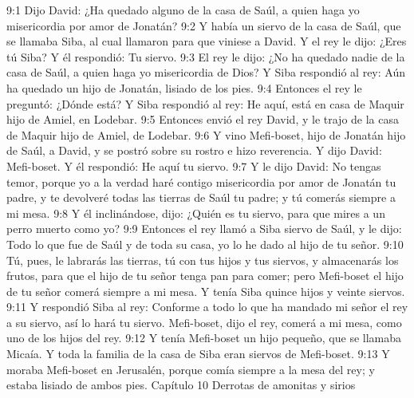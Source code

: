 9:1 Dijo David: ¿Ha quedado alguno de la casa de Saúl, a quien haga yo misericordia por amor de Jonatán? 
9:2 Y había un siervo de la casa de Saúl, que se llamaba Siba, al cual llamaron para que viniese a David. Y el rey le dijo: ¿Eres tú Siba? Y él respondió: Tu siervo.  
9:3 El rey le dijo: ¿No ha quedado nadie de la casa de Saúl, a quien haga yo misericordia de Dios? Y Siba respondió al rey: Aún ha quedado un hijo de Jonatán, lisiado de los pies.  
9:4 Entonces el rey le preguntó: ¿Dónde está? Y Siba respondió al rey: He aquí, está en casa de Maquir hijo de Amiel, en Lodebar.  
9:5 Entonces envió el rey David, y le trajo de la casa de Maquir hijo de Amiel, de Lodebar.  
9:6 Y vino Mefi-boset, hijo de Jonatán hijo de Saúl, a David, y se postró sobre su rostro e hizo reverencia. Y dijo David: Mefi-boset. Y él respondió: He aquí tu siervo.  
9:7 Y le dijo David: No tengas temor, porque yo a la verdad haré contigo misericordia por amor de Jonatán tu padre, y te devolveré todas las tierras de Saúl tu padre; y tú comerás siempre a mi mesa.  
9:8 Y él inclinándose, dijo: ¿Quién es tu siervo, para que mires a un perro muerto como yo?  
9:9 Entonces el rey llamó a Siba siervo de Saúl, y le dijo: Todo lo que fue de Saúl y de toda su casa, yo lo he dado al hijo de tu señor.  
9:10 Tú, pues, le labrarás las tierras, tú con tus hijos y tus siervos, y almacenarás los frutos, para que el hijo de tu señor tenga pan para comer; pero Mefi-boset el hijo de tu señor comerá siempre a mi mesa. Y tenía Siba quince hijos y veinte siervos.  
9:11 Y respondió Siba al rey: Conforme a todo lo que ha mandado mi señor el rey a su siervo, así lo hará tu siervo. Mefi-boset, dijo el rey, comerá a mi mesa, como uno de los hijos del rey.  
9:12 Y tenía Mefi-boset un hijo pequeño, que se llamaba Micaía. Y toda la familia de la casa de Siba eran siervos de Mefi-boset.  
9:13 Y moraba Mefi-boset en Jerusalén, porque comía siempre a la mesa del rey; y estaba lisiado de ambos pies.  
Capítulo 10
Derrotas de amonitas y sirios  
 

